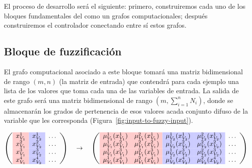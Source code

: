 El proceso de desarrollo será el siguiente: primero, construiremos cada uno de los bloques fundamentales del  como un grafos computacionales; después construiremos el controlador conectando entre sí estos grafos.

\subsection{Bloque de fuzzificación}

El grafo computacional asociado a este bloque tomará una matriz bidimensional de rango $(m, n)$ (la matriz de entrada) que contendrá para cada ejemplo una lista de los valores que toma cada una de las variables de entrada. La salida de este grafo será una matriz bidimensional de rango $(m, \sum_{i=1}^n N_i)$, donde se almacenarán los grados de pertenencia de esos valores acada conjunto difuso de la variable que les corresponda (Figura~\ref{fig:input-to-fuzzy-input}).

\begin{figure*}[t]
	\centering
	\begin{equation*}
		\left(\begin{array}{>{\columncolor{red!20}}c>{\columncolor{blue!20}}cc}
		x^1_{V_1} & x^1_{V_2} & \ldots \\
		x^2_{V_1} & x^2_{V_2} & \ldots \\
		x^3_{V_1} & x^3_{V_2} & \ldots \\
		x^4_{V_1} & x^4_{V_2} & \ldots \\
		\end{array}\right)
		\quad \rightarrow \quad 
		\left(\begin{array}{>{\columncolor{red!20}}c>{\columncolor{red!20}}c>{\columncolor{blue!20}}c>{\columncolor{blue!20}}cc}
		\mu^1_{V_1}(x^1_{V_1}) & \mu^2_{V_1}(x^1_{V_1}) & \mu^1_{V_2}(x^1_{V_2}) & \mu^2_{V_2}(x^1_{V_2}) & \ldots \\
		\mu^1_{V_1}(x^2_{V_1}) & \mu^2_{V_1}(x^2_{V_1}) & \mu^1_{V_2}(x^2_{V_2}) & \mu^2_{V_2}(x^2_{V_2}) & \ldots \\
		\mu^1_{V_1}(x^3_{V_1}) & \mu^2_{V_1}(x^3_{V_1}) & \mu^1_{V_2}(x^3_{V_2}) & \mu^2_{V_2}(x^3_{V_2}) & \ldots \\
		\mu^1_{V_1}(x^4_{V_1}) & \mu^2_{V_1}(x^4_{V_1}) & \mu^1_{V_2}(x^4_{V_2}) & \mu^2_{V_2}(x^4_{V_2}) & \ldots \\
		\end{array}\right)
	\end{equation*}
	\caption[Ejemplo de operación en el bloque de fuzzificación]{El bloque de fuzzificación transformará los valores de sus respectivos dominios al de cada conjunto difuso. La matriz generada tendrá tantas columnas como conjuntos difusos posee cada variable.}
	\label{fig:input-to-fuzzy-input}
\end{figure*}

